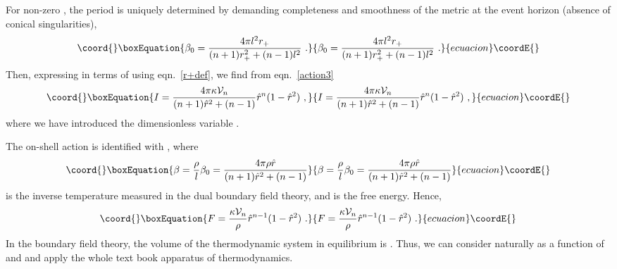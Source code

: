 \documentclass[a4paper,12pt]{article}
\begin{document}
For non-zero \myHighlight{$\mu$}\coordHE{}, the period \coordHE{} is uniquely determined by
demanding completeness and smoothness of the metric at the event
horizon (absence of conical singularities),
\begin{equation}\coord{}\boxEquation{
\label{beta0}
  \beta_0 = \frac{4\pi l^2 r_+}{(n+1)r_+^2 +(n-1) l^2}~.
}{
\beta_0 = \frac{4\pi l^2 r_+}{(n+1)r_+^2 +(n-1) l^2}~.
}{ecuacion}\coordE{}\end{equation}
Then, expressing \myHighlight{$\mu$}\coordHE{} in terms of \coordHE{} using eqn.\ \eqref{r+def}, we
find from eqn.\ \eqref{action3}
\begin{equation}\coord{}\boxEquation{
\label{I}
  I= \frac{4\pi \kappa \V_n}{(n+1) \rh^2 +(n-1)} \rh^n (1-\rh^2)~,
}{
I= \frac{4\pi \kappa \V_n}{(n+1) \rh^2 +(n-1)} \rh^n (1-\rh^2)~,
}{ecuacion}\coordE{}\end{equation}
where we have introduced the dimensionless variable \coordHE{}.

The on-shell action \coordHE{} is identified with \coordHE{}, where
\begin{equation}\coord{}\boxEquation{
\label{betadef}
  \beta = \frac{\rho}l \beta_0 =
  \frac{4\pi\rho\rh}{(n+1)\rh^2 +(n-1)}
}{
\beta = \frac{\rho}l \beta_0 =
  \frac{4\pi\rho\rh}{(n+1)\rh^2 +(n-1)}
}{ecuacion}\coordE{}\end{equation}
is the inverse temperature measured in the dual boundary field
theory, and \coordHE{} is the free energy.
Hence,
\begin{equation}\coord{}\boxEquation{
\label{F}
  F = \frac{\kappa \V_n}{\rho} \rh^{n-1} (1-\rh^2)~.
}{
F = \frac{\kappa \V_n}{\rho} \rh^{n-1} (1-\rh^2)~.
}{ecuacion}\coordE{}\end{equation}
In the boundary field theory, the volume of the thermodynamic system
in equilibrium is \coordHE{}. Thus, we can consider \coordHE{}
naturally as a function of \myHighlight{$\beta$}\coordHE{} and \coordHE{} and apply the whole text
book apparatus of thermodynamics.
\end{document}
